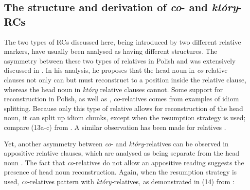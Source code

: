 \documentclass[output=paper]{langsci/langscibook}
\begin{document}
\subsection{The structure and derivation of \textit{co}{}- and \textit{który}{}-RCs}%
The two types of RCs discussed here, being introduced by two different relative markers, have usually been analysed as having different structures. The asymmetry between these two types of relatives in Polish and  was extensively discussed in \citet{Szczegielniak2005,Szczegielniak2006}. In his analysis, he proposes that the head noun in \textit{co} relative clauses not only can but must reconstruct to a position inside the relative clause, whereas the head noun in \textit{który} relative clauses cannot. Some support for reconstruction in Polish, as well as , \textit{co}{}-relatives comes from examples of idiom splitting. Because only this type of relative allows for reconstruction of the head noun, it can split up idiom chunks, except when the resumption strategy is used; compare (13a-c) from \citet[377]{Szczegielniak2006}. A similar observation has been made for  relatives \citep{Mitrović2012}.

\ea%
    \label{ex:leska:13}
    \z
\z    
    
Yet, another asymmetry between \textit{co}{}- and \textit{który}{}-relatives can be observed in appositive relative clauses, which are analysed as being separate from the head noun \citep{Chierchia1990}. The fact that \textit{co}{}-relatives do not allow an appositive reading suggests the presence of head noun reconstruction. Again, when the resumption strategy is used, \textit{co}{}-relatives pattern with \textit{który-}relatives, as demonstrated in (14) from \citet[378]{Szczegielniak2006}:
\end{document}
